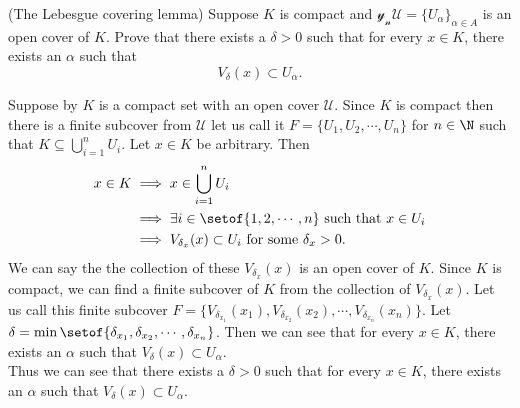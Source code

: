 \documentclass[answers,12pt,addpoints]{exam}
\begin{document}
\begin{questions}
\question (The Lebesgue covering lemma) Suppose $K$ is compact and $\mathscr{y_nU}= \{U_\alpha\}_{\alpha \in A}$ is an open cover of $K$. Prove that there exists a $\delta > 0$ such that for every $x \in K$, there exists an $\alpha$ such that
\[
V_\delta(x) \subset U_\alpha.
\]
\begin{solution}
    Suppose by $K$ is a compact set with an open cover $\mathscr{U}$. Since $K$ is compact then there is a finite subcover from $\mathscr{U}$ let us call it $F = \{U_1, U_2, \cdots, U_n\}$ for $n \in \N$  such that $K \subseteq \bigcup_{i=1}^n U_i$. Let $x \in K$ be arbitrary. Then \\
    \begin{align*}
        x \in K &\implies x \in \bigcup_{i=1}^n U_i \\
        &\implies \exists i \in \setof{1,2,\cdots,n} \text{ such that } x \in U_i \\
        &\implies V_{\delta_x}(x) \subset U_i \text{ for some } \delta_x > 0.
    \end{align*}
    We can say the the collection of these $V_{\delta_x}(x)$ is an open cover of $K$. Since $K$ is compact, we can find a finite subcover of $K$ from the collection of $V_{\delta_x}(x)$. Let us call this finite subcover $F = \{V_{\delta_{x_1}}(x_1), V_{\delta_{x_2}}(x_2), \cdots, V_{\delta_{x_n}}(x_n)\}$. Let $\delta = \min\setof{\delta_{x_1}, \delta_{x_2}, \cdots, \delta_{x_n}}$. Then we can see that for every $x \in K$, there exists an $\alpha$ such that $V_\delta(x) \subset U_\alpha$. \\
    Thus we can see that there exists a $\delta > 0$ such that for every $x \in K$, there exists an $\alpha$ such that $V_\delta(x) \subset U_\alpha$.
\end{solution}
\end{questions}
\end{document}
